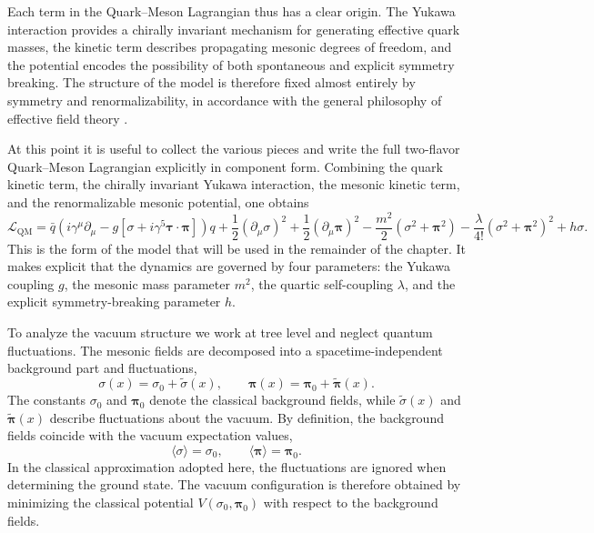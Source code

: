 Each term in the Quark--Meson Lagrangian thus has a clear origin. The
Yukawa interaction provides a chirally invariant mechanism for
generating effective quark masses, the kinetic term describes
propagating mesonic degrees of freedom, and the potential encodes the
possibility of both spontaneous and explicit symmetry breaking. The
structure of the model is therefore fixed almost entirely by symmetry
and renormalizability, in accordance with the general philosophy of
effective field theory \cite{WeinbergEFT}.

At this point it is useful to collect the various pieces and write the
full two-flavor Quark--Meson Lagrangian explicitly in component form.
Combining the quark kinetic term, the chirally invariant Yukawa
interaction, the mesonic kinetic term, and the renormalizable mesonic
potential, one obtains
\begin{equation}
\mathcal{L}_{\mathrm{QM}} =
\bar q\left(i\gamma^\mu\partial_\mu
- g\left[\sigma + i\gamma^5\boldsymbol{\tau}\cdot\boldsymbol{\pi}\right]\right)q
+ \frac{1}{2}(\partial_\mu\sigma)^2
+ \frac{1}{2}(\partial_\mu\boldsymbol{\pi})^2
- \frac{m^2}{2}(\sigma^2+\boldsymbol{\pi}^2)
- \frac{\lambda}{4!}(\sigma^2+\boldsymbol{\pi}^2)^2
+ h\sigma .
\label{eq:L_QM_full}
\end{equation}
This is the form of the model that will be used in the remainder of
the chapter. It makes explicit that the dynamics are governed by four
parameters: the Yukawa coupling $g$, the mesonic mass parameter $m^2$,
the quartic self-coupling $\lambda$, and the explicit symmetry-breaking
parameter $h$.

To analyze the vacuum structure we work at tree level and neglect
quantum fluctuations. The mesonic fields are decomposed into a
spacetime-independent background part and fluctuations,
\begin{equation}
\sigma(x) = \sigma_0 + \tilde{\sigma}(x),
\qquad
\boldsymbol{\pi}(x) = \boldsymbol{\pi}_0 + \tilde{\boldsymbol{\pi}}(x).
\label{eq:quantum_and_constant}
\end{equation}
The constants $\sigma_0$ and $\boldsymbol{\pi}_0$ denote the classical
background fields, while $\tilde{\sigma}(x)$ and
$\tilde{\boldsymbol{\pi}}(x)$ describe fluctuations about the vacuum.
By definition, the background fields coincide with the vacuum
expectation values,
\begin{equation}
\langle \sigma \rangle = \sigma_0,
\qquad
\langle \boldsymbol{\pi} \rangle = \boldsymbol{\pi}_0 .
\end{equation}
In the classical approximation adopted here, the fluctuations are
ignored when determining the ground state. The vacuum configuration is
therefore obtained by minimizing the classical potential
$V(\sigma_0,\boldsymbol{\pi}_0)$ with respect to the background fields.

